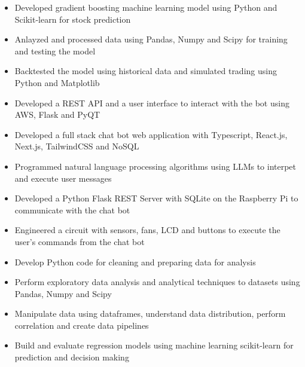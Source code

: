 \documentclass[11pt,a4paper,ragged2e]{altacv}
\begin{document}
\begin{paracol}{1}
\begin{itemize}
\item Developed gradient boosting machine learning model using Python and Scikit-learn for stock prediction
\item Anlayzed and processed data using Pandas, Numpy and Scipy for training and testing the model 
\item Backtested the model using historical data and simulated trading using Python and Matplotlib
\item Developed a REST API and a user interface to interact with the bot using AWS, Flask and PyQT
\end{itemize}

\tightdivider


\begin{itemize}
\item Developed a full stack chat bot web application with Typescript, React.js, Next.js, TailwindCSS and NoSQL
\item Programmed natural language processing algorithms using LLMs to interpet and execute user messages 
\item Developed a Python Flask REST Server with SQLite on the Raspberry Pi to communicate with the chat bot
\item Engineered a circuit with sensors, fans, LCD and buttons to execute the user's commands from the chat bot 
\end{itemize}

\medskip

\begin{itemize}
\item Develop Python code for cleaning and preparing data for analysis 
\item Perform exploratory data analysis and analytical techniques to datasets using Pandas, Numpy and Scipy
\item Manipulate data using dataframes, understand data distribution, perform correlation and create data pipelines
\item Build and evaluate regression models using machine learning scikit-learn for prediction and decision making
\end{itemize}
\tightdivider


\end{paracol}
\end{document}
